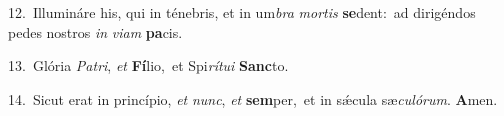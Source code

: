 {\numbfont\textcolor{\numbcolor}{12.}}~Illumináre his, qui in ténebris, et in um\textit{bra} \textit{mor}\-\textit{tis} \textbf{se}\-dent:~\star ad dirigéndos pedes nostros \textit{in} \textit{vi}\-\textit{am} \textbf{pa}\-cis.\par
{\numbfont\textcolor{\numbcolor}{13.}}~Glória \textit{Pa}\-\textit{tri}, \textit{et} \textbf{Fí}\-lio,~\star et Spi\-\textit{rí}\-\textit{tu}\textit{i} \textbf{Sanc}\-to.\par
{\numbfont\textcolor{\numbcolor}{14.}}~Sicut erat in princípio, \textit{et} \textit{nunc}\-, \textit{et} \textbf{sem}\-per,~\star et in sǽcula sæ\-\textit{cu}\-\textit{ló}\textit{rum}. \textbf{A}\-men.\par
